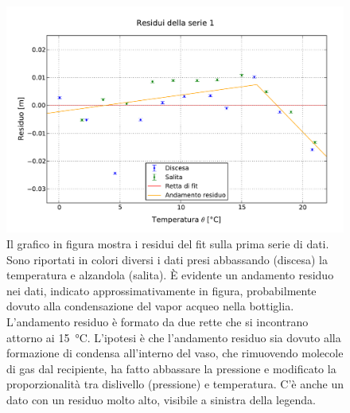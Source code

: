 \begin{figure}[p]
    \centering
    \includegraphics[width=118mm]{immagini/fit1.pdf}
    \caption{Il grafico in figura mostra i residui del fit sulla prima serie di dati. Sono riportati in colori
    diversi i dati presi abbassando (discesa) la temperatura e alzandola (salita). È evidente un andamento residuo nei dati,
    indicato approssimativamente in figura, probabilmente dovuto alla condensazione del vapor acqueo nella bottiglia. L'andamento
    residuo è formato da due rette che si incontrano attorno ai \SI{15}{\celsius}. L'ipotesi è che l'andamento residuo sia dovuto alla
    formazione di condensa all'interno del vaso, che rimuovendo molecole di gas dal recipiente, ha fatto abbassare la pressione e modificato
    la proporzionalità tra dislivello (pressione) e temperatura. C'è anche
    un dato con un residuo molto alto, visibile a sinistra della legenda.}
    \label{fig:fit1}
\end{figure}

